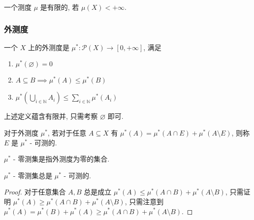 \begin{definition}
    \label {definition:finite measure}
    一个测度 \(\mu\) 是有限的, 若 \(\mu(X) < +\infty\).
\end{definition}

\subsubsection{外测度}

\begin{definition}[外测度]
    一个 \(X\) 上的外测度是 \(\mu^\ast : \mathcal{P} (X) \to [0, +\infty]\), 满足

    \begin{enumerate}
        \item \(\mu^\ast(\varnothing) = 0\)
        \item \(A \subseteq B \implies \mu^\ast(A) \leq \mu^\ast(B)\)
        \item \(\mu^\ast(\bigcup_{i \in \mathbb{N}} A_i) \leq \sum_{i \in \mathbb{N}} \mu^\ast(A_i)\)
    \end{enumerate}
\end{definition}

上述定义蕴含有限并, 只需考察 \(\varnothing\) 即可.

\begin{definition}[\(\mu^\ast\) - 可测]
    对于外测度 \(\mu^\ast\), 若对于任意 \(A \subseteq X\) 有 \(\mu^\ast(A) = \mu^\ast(A \cap E) + \mu^\ast(A \setminus E)\), 则称 \(E\) 是 \(\mu^\ast\) - 可测的.
\end{definition}

\begin{definition}[零测]
    \(\mu^\ast\) - 零测集是指外测度为零的集合.
\end{definition}

\begin{lemma}
    \(\mu^\ast\) - 零测集总是 \(\mu^\ast\) - 可测的.

    \begin{proof}
        对于任意集合 \(A,B\) 总是成立 \(\mu^\ast(A) \leq \mu^\ast(A \cap B) + \mu^\ast(A \setminus B)\), 只需证明 \(\mu^\ast(A) \geq \mu^\ast(A \cap B) + \mu^\ast(A \setminus B)\),
        只需注意到 \(\mu^\ast(A) = \mu^\ast(B) + \mu^\ast(A) \geq \mu^\ast(A \cap B) + \mu^\ast(A \setminus B)\).
    \end{proof}
\end{lemma}

